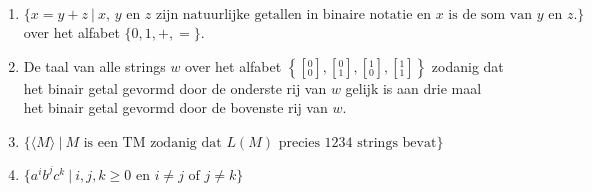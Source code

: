 \documentclass[a4paper]{article}
\newcommand{\twar}[2]{\left[ { }^{#1}_{#2} \right] }
\begin{document}
\begin{enumerate}
  \begin{enumerate}
    \item $\{ x = y+z \  | \ \text{$x$, $y$ en $z$ zijn natuurlijke getallen in binaire notatie en $x$ is de som van $y$ en $z$.} \}$ over het alfabet $\{0,1,+,=\}$.
    \item De taal van alle strings $w$ over het alfabet $\left\{ \twar{0}{0}, \twar{0}{1}, \twar{1}{0}, \twar{1}{1} \right\}$ zodanig dat het binair getal gevormd door de onderste rij van $w$ gelijk is aan drie maal het binair getal gevormd door de bovenste rij van $w$. 
    \item $\{ \langle M \rangle \ | \ \text{$M$ is een TM zodanig dat $L(M)$ precies 1234 strings bevat} \}$ %
    \item $\{ a^ib^jc^k \ | \ \text{$i,j,k \geq 0$ en $i \neq j$ of $j \neq k$} \}$ 
  \end{enumerate}
\end{enumerate}
\end{document}
